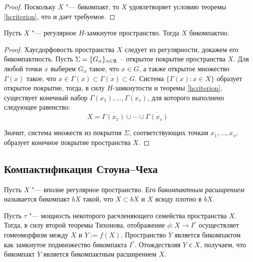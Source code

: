 \begin{proof}
    Поскольку $X$ "--- бикомпакт, то $X$ удовлетворяет условию теоремы \ref{hcriterion}, что и дает требуемое.
\end{proof}

\begin{proposition}
    Пусть $X$ "--- регулярное $H$-замкнутое пространство. Тогда $X$ бикомпактно.
\end{proposition}

\begin{proof}
    Хаусдорфовость пространства $X$ следует из регулярности, докажем его бикомпактность. Пусть $\Sigma = \lbrace G_\alpha\rbrace_{\alpha \in \mathfrak A}$ -- открытое покрытие пространства $X$. Для любой точки $x$ выберем $G_\alpha$ такое, что $x \in G$, а также открытое множество $\Gamma(x)$ такое, что $x \in \Gamma(x) \subset \overline{\Gamma(x)} \subset G$. Система $\{\Gamma(x): x \in X\}$ образует открытое покрытие, тогда, в силу $H$-замкнутости и теоремы \ref{hcriterion}, существует конечный набор $\Gamma(x_1), \ldots, \Gamma(x_s)$, для которого выполнено следующее равенство:
    \[X = \overline{\Gamma(x_1)} \cup \dotsb \cup \overline{\Gamma(x_s)}\]
    
    Значит, система множеств из покрытия $\Sigma$, соответствующих точкам $x_1, \dotsc, x_s$, образует конечное покрытие пространства $X$.
\end{proof}

\subsection{Компактификация Стоуна--Чеха}

\begin{definition}
    Пусть $X$ "--- вполне регулярное пространство. Его \textit{бикомпактным расширением} называется бикомпакт $bX$ такой, что $X \subset bX$ и $X$ всюду плотно в $bX$.
\end{definition}

\begin{note}
    Пусть $\tau$ "--- мощность некоторого расчленяющего семейства пространства $X$. Тогда, в силу второй теоремы Тихонова, отображение $\phi: X \to I^\tau$ осуществляет гомеоморфизм между $X$ и $Y := f(X)$. Пространство $\overline{Y}$ является бикомпактом как замкнутое подмножество бикомпакта $I^\tau$. Отождествляя $Y$ с $X$, получаем, что бикомпакт $\overline{Y}$ является бикомпактным расширением $X$.
\end{note}

